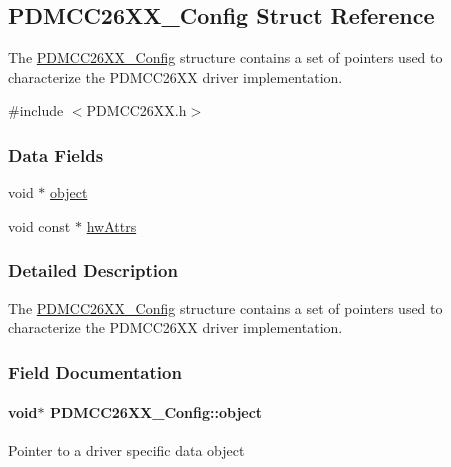 \subsection{P\+D\+M\+C\+C26\+X\+X\+\_\+\+Config Struct Reference}
\label{struct_p_d_m_c_c26_x_x___config}


The \hyperlink{struct_p_d_m_c_c26_x_x___config}{P\+D\+M\+C\+C26\+X\+X\+\_\+\+Config} structure contains a set of pointers used to characterize the P\+D\+M\+C\+C26\+X\+X driver implementation.  




{\ttfamily \#include $<$P\+D\+M\+C\+C26\+X\+X.\+h$>$}

\subsubsection*{Data Fields}
\begin{DoxyCompactItemize}
\item 
void $\ast$ \hyperlink{struct_p_d_m_c_c26_x_x___config_ae8b1f8e6eac1a99fd352df7fa0d3fa4a}{object}
\item 
void const $\ast$ \hyperlink{struct_p_d_m_c_c26_x_x___config_a41f103fa307fa16ee21cb639023ba934}{hw\+Attrs}
\end{DoxyCompactItemize}


\subsubsection{Detailed Description}
The \hyperlink{struct_p_d_m_c_c26_x_x___config}{P\+D\+M\+C\+C26\+X\+X\+\_\+\+Config} structure contains a set of pointers used to characterize the P\+D\+M\+C\+C26\+X\+X driver implementation. 

\subsubsection{Field Documentation}
\paragraph[{object}]{\setlength{\rightskip}{0pt plus 5cm}void$\ast$ P\+D\+M\+C\+C26\+X\+X\+\_\+\+Config\+::object}\label{struct_p_d_m_c_c26_x_x___config_ae8b1f8e6eac1a99fd352df7fa0d3fa4a}
Pointer to a driver specific data object 
